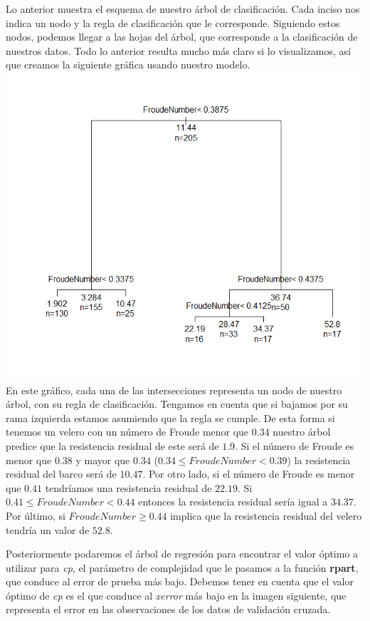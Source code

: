 \documentclass[twoside]{article}
\begin{document}
\begin{multicols}{2}
Lo anterior muestra el esquema de nuestro \'arbol de clasificaci\'on. Cada inciso nos indica un nodo y la regla de clasificaci\'on que le corresponde. Siguiendo estos nodos, podemos llegar a las hojas del \'arbol, que corresponde a la clasificaci\'on de nuestros datos. Todo lo anterior resulta mucho m\'as claro si lo visualizamos, as\'i que creamos la siguiente gr\'afica usando nuestro modelo.\\

\includegraphics[scale=0.5]{images/pic_37.png}\\

En este gr\'afico, cada una de las intersecciones representa un nodo de nuestro \'arbol, con su regla de clasificaci\'on. Tengamos en cuenta que si bajamos por su rama izquierda estamos asumiendo que la regla se cumple. De esta forma si tenemos un velero con un n\'umero de Froude menor que $0.34$ nuestro \'arbol predice que la resistencia residual de este ser\'a de $1.9$. Si el n\'umero de Froude es menor que $0.38$ y mayor que $0.34$ ($0.34 \leq FroudeNumber < 0.39$) la resistencia residual del barco ser\'a de $10.47$. Por otro lado, si el n\'umero de Froude es menor que $0.41$ tendr\'iamos una resistencia residual de $22.19$. Si $0.41 \leq FroudeNumber < 0.44$ entonces la resistencia residual ser\'ia igual a $34.37$. Por \'ultimo, si $FroudeNumber \geq 0.44$ implica que la resistencia residual del velero tendr\'ia un valor de $52.8$.

Posteriormente podaremos el \'arbol de regresi\'on para encontrar el valor \'optimo a utilizar para \textit{cp}, el par\'ametro de complejidad que le pasamos a la funci\'on \textbf{rpart}, que conduce al error de prueba m\'as bajo. Debemos tener en cuenta que el valor \'optimo de \textit{cp} es el que conduce al \textit{xerror} m\'as bajo en la imagen siguiente, que representa el error en las observaciones de los datos de validaci\'on cruzada.\\


\end{multicols}
\end{document}
